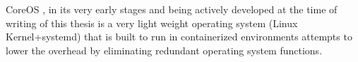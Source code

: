 CoreOS \cite{coreos}, in its very early stages and being actively developed at the time of writing of this thesis is a very light weight operating system (Linux Kernel+systemd) that is built to run in containerized environments attempts to lower the overhead by eliminating redundant operating system functions.











